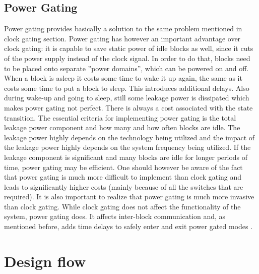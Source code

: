  \subsection{Power Gating}
 Power gating provides basically a solution to the same problem mentioned in clock gating section. Power gating has however an important advantage over clock gating: it is capable to save static power of idle blocks as well, since it cuts of the power supply instead of 
 the clock signal. In order to do that, blocks need to be placed onto separate ”power domains”, which can be powered on and off. When a block is asleep it costs some time to wake it up again, the same as it costs 
 some time to put a block to sleep. This introduces additional delays. Also during wake-up and going to sleep, still some leakage power is dissipated which makes power gating not perfect. There is always a cost associated with the state transition. The essential criteria for implementing power gating is the total leakage power component and how many and how often blocks are idle. The leakage power highly depends on the technology being utilized and the impact of the leakage 
 power highly depends on the system frequency being utilized. If the leakage component is significant and many blocks are idle for longer periods of time, power gating may be efficient. One should however be aware of the fact that power gating is much more difficult to implement than clock gating and leads to significantly higher costs (mainly because of all the switches that are required). It is also important to realize that power 
 gating is much more invasive than clock gating. While clock gating does not affect the functionality of the system, power gating does. It affects inter-block communication and, as mentioned before, adds time delays to safely enter and exit power gated modes \cite{LowPowerMethod}. 
 
 \section{Design flow}
 

